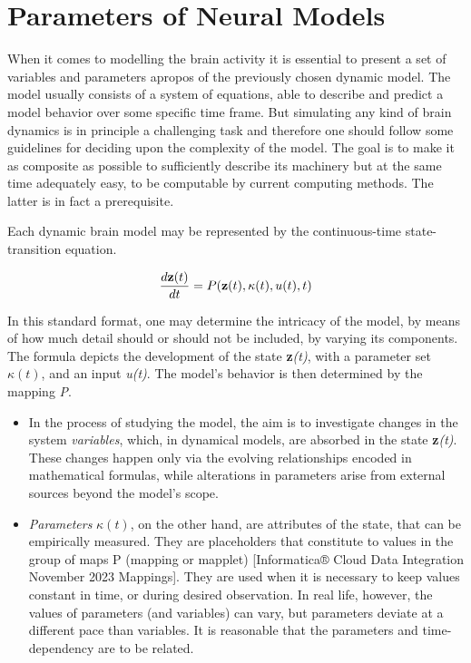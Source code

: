 \documentclass[class={myRUCProject}, crop=false]{standalone}
\begin{document}
 
\section{Parameters of Neural Models}

When it comes to modelling the brain activity it is essential to present a set of variables and parameters apropos of the previously chosen dynamic model. 
The model usually consists of a system of equations, able to describe and predict a model behavior over some specific time frame. But simulating any kind of brain dynamics is in principle a challenging task and therefore one should follow some guidelines for deciding upon the complexity of the model. The goal is to make it as composite as possible to sufficiently describe its machinery but at the same time adequately easy, to be computable by current computing methods. The latter is in fact a prerequisite.

Each dynamic brain model may be represented by the continuous-time state-transition equation.

\begin{equation}
    \frac{d\mathbf{z}(t)}{dt} = P(\mathbf{z}(t), \kappa(t), u(t),t)
\end{equation}

In this standard format, one may determine the intricacy of the model, by means of how much detail should or should not be included, by varying its components. The formula depicts the development of the state \textbf{z}\textit{(t)}, with a parameter set \(\kappa (t)\), and an input \textit{u(t)}. The model’s behavior is then determined by the mapping \textit{P}. 

\begin{itemize}
    \item In the process of studying the model, the aim is to investigate changes in the system \textit{variables}, which, in dynamical models, are absorbed in the state \textbf{z}\textit{(t)}. These changes happen only via the evolving relationships encoded in mathematical formulas, while alterations in parameters arise from external sources beyond the model's scope. 
    \item \textit{Parameters} \(\kappa (t)\), on the other hand, are attributes of the state, that can be empirically measured. They are placeholders that constitute to values in the group of maps P (mapping or mapplet) [Informatica® Cloud Data Integration November 2023 Mappings]. They are used when it is necessary to keep values constant in time, or during desired observation. In real life, however, the values of parameters (and variables) can vary, but parameters deviate at a different pace than variables. It is reasonable that the parameters and time-dependency are to be related. 
\end{itemize} 
\end{document}
